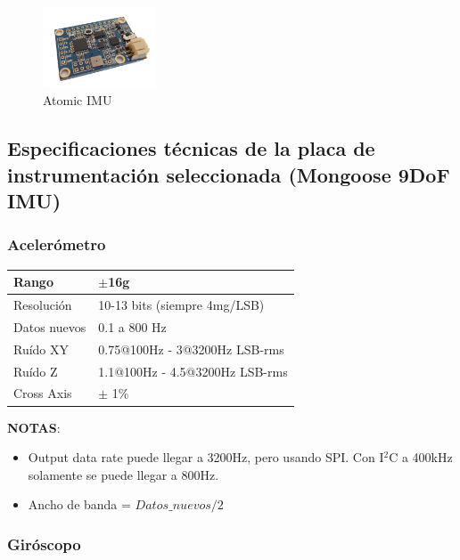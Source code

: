 \documentclass[main]{subfiles}
\begin{document}
\begin{figure}[H]
	\centering
	\includegraphics[width=0.3\textwidth]{./pics_eleccion_hardware/Mongoose.png}
	\caption{Atomic IMU}
	\label{fig:Mongoose}
\end{figure}

\newpage
\subsection{Especificaciones t\'ecnicas de la placa de instrumentaci\'on seleccionada (Mongoose 9DoF IMU)}
\vspace*{15pt}

\subsubsection{Aceler\'ometro}

\begin{table}[H]
\begin{center}
\begin{tabular}{|p{3cm}|p{6.5cm}|}
\hline
Rango & $\pm$16g \\
\hline
Resoluci\'on & 10-13 bits (siempre 4mg/LSB) \\
\hline
Datos nuevos &  0.1 a 800 Hz\\
\hline
Ru\'ido XY & 0.75@100Hz - 3@3200Hz LSB-rms\\
\hline
Ru\'ido Z & 1.1@100Hz - 4.5@3200Hz LSB-rms\\
\hline
Cross Axis & $\pm$ 1\% \\
\hline
\end{tabular}
\label{tab:acc}
\end{center}
\end{table}

\textbf{NOTAS}:
\begin{itemize}
\item Output data rate puede llegar a 3200Hz, pero usando SPI. Con I$^2$C a 400kHz solamente se puede llegar a 800Hz.
\item Ancho de banda = $Datos\_nuevos/2$
\end{itemize}

\subsubsection{Gir\'oscopo}
\end{document}
